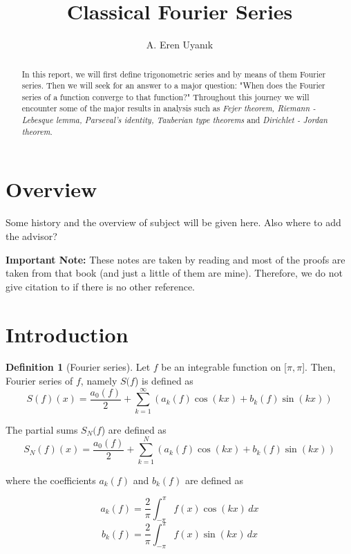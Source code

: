 \documentclass[12pt]{amsart}
\theoremstyle{definition}
\newtheorem{definition}[theorem]{Definition}
\begin{document}
\title[Classical Fourier Series]{Classical Fourier Series}


\author{A. Eren Uyanık}


\begin{abstract}

In this report, we will first define trigonometric series and by means of them Fourier series. Then we will seek for an answer to a major question: "When does the Fourier series of a function converge to that function?" Throughout this journey we will encounter some of the major results in analysis such as \emph{Fejer theorem, Riemann - Lebesque lemma, Parseval's identity, Tauberian type theorems} and \emph{Dirichlet - Jordan theorem}.
\end{abstract}
\maketitle


\section*{Overview} %

Some history and the overview of subject  will be given here. Also where to add the advisor?

\textbf{Important Note:} These notes are taken by reading \cite{Wade} and most of the proofs are taken from that book (and just a little of them are mine). Therefore, we do not give citation to \cite{Wade} if there is no other reference.


\section{Introduction}


\begin{definition}[Fourier series]\footnotemark{}


    Let \(f\) be an integrable function on [$\pi, \pi$]. Then, Fourier series of \(f\), namely $S($\(f\)) is defined as
    \[
    S(f)(x) = \frac{a_0(f)}{2} +  \sum_{k = 1}^{\infty} (a_k(f)  \cos(kx) + b_k(f)  \sin(kx))
    \]

    The partial sums $S_N($\(f\)) are defined as
    \[
    S_N(f)(x) = \frac{a_0(f)}{2} +  \sum_{k = 1}^{N} (a_k(f)  \cos(kx) + b_k(f)  \sin(kx))
    \]

    where the coefficients $a_k(f)$ and $b_k(f)$ are defined as

    \[
    a_k(f) = \frac{2}{\pi}\int_{-\pi}^{\pi} f(x) \cos(kx)\,dx
    \]
    \[
    b_k(f) = \frac{2}{\pi}\int_{-\pi}^{\pi} f(x) \sin(kx)\,dx
    \]
\end{definition}
\end{document}
